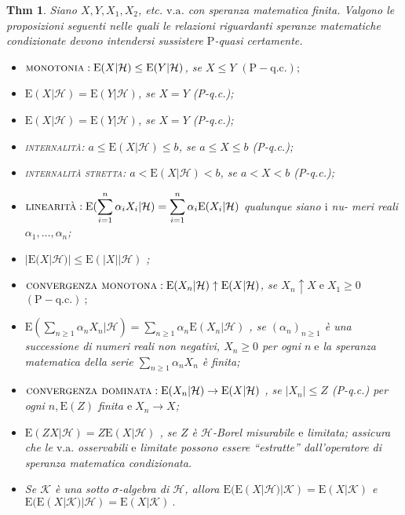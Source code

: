 \documentclass[a4paper,11pt]{article}
\theoremstyle{plain}
\newtheorem{thm}{Thm}[section]
\theoremstyle{definition}
\theoremstyle{remark}
\begin{document}
\begin{thm} Siano $X, Y, X_{1}, X_{2}$, etc. $\mathrm{v}.\mathrm{a}$. con speranza matematica finita. Valgono le proposizioni seguenti nelle quali le relazioni riguardanti speranze matematiche condizionate devono intendersi sussistere $\mathrm{P}$-quasi certamente.
\begin{itemize}
    \item $\textsc{monotonia}: \mathrm{E}(X|\mathcal{H})\leq \mathrm{E}(Y|\mathcal{H})$, se $X\leq Y$ $(\mathrm{P}-\mathrm{q}.\mathrm{c}.);$
    
    \item $\mathrm{E}(X|\mathcal{H})=\mathrm{E}(Y|\mathcal{H})$, se $X=Y$ (P-q.c.);
    
    \item $\mathrm{E}(X|\mathcal{H})=\mathrm{E}(Y|\mathcal{H})$, se $X=Y$ (P-q.c.);
    
    \item \textsc{internalità}: $a\leq \mathrm{E}(X|\mathcal{H})\leq b$, se $a\leq X\leq b$ (P-q.c.);
    
    \item  \textsc{internalità stretta}: $a<\mathrm{E}(X|\mathcal{H})<b$, se $a<X<b$ (P-q.c.);
    \item $\textsc{linearità}: \displaystyle \mathrm{E}(\sum_{i=1}^{n}\alpha_{i}X_{i}|\mathcal{H})=\sum_{i=1}^{n}\alpha_{i}\mathrm{E}(X_{i}|\mathcal{H})$ qualunque siano $\mathrm{i}$ nu- meri reali $\alpha_{1}, \ldots, \alpha_{n}$;
    
    \item  $|\mathrm{E}(X|\mathcal{H})|\leq \mathrm{E}(|X||\mathcal{H})$ ;
    \item $ \textsc{convergenza monotona}: \mathrm{E}(X_{n}|\mathcal{H})\uparrow \mathrm{E}(X|\mathcal{H})$, se $X_{n}\uparrow X\mathrm{\; e \;}X_{1}\geq0$ $(\mathrm{P}- \mathrm{q}.\mathrm{c}.)\ ;$
    \item  $\displaystyle \mathrm{E}(\sum_{n\geq 1}\alpha_{n}X_{n}|\mathcal{H})=\sum_{n\geq 1}\alpha_{n}\mathrm{E}(X_{n}|\mathcal{H})$ , se $(\alpha_{n})_{n\geq 1}$ è una successione di numeri reali non negativi, $X_{n}\geq 0$ per ogni $n\mathrm{\; e}$ la speranza matematica della serie $\displaystyle \sum_{n\geq 1}\alpha_{n}X_{n}$ è finita;
    \item $ \textsc{convergenza dominata}: \mathrm{E}(X_{n}|\mathcal{H})\rightarrow \mathrm{E}(X|\mathcal{H})$ , se $|X_{n}|\leq Z$ (P-q.c.) per ogni $n, \mathrm{E}(Z)$ finita $\mathrm{e \;}X_{n}\rightarrow X$;
    
    \item $\mathrm{E}(ZX|\mathcal{H})=Z\mathrm{E}(X|\mathcal{H})$ , se $Z$ è $\mathcal{H}$-Borel misurabile $\mathrm{e}$ limitata; assicura che le $\mathrm{v}.\mathrm{a}.$ osservabili $\mathrm{e}$ limitate possono essere ``estratte'' dall'operatore di speranza matematica condizionata.
    
    \item Se $\mathcal{K}$ è una sotto $\sigma$-algebra di $\mathcal{H}$, allora $\mathrm{E}(\mathrm{E}(X|\mathcal{H})|\mathcal{K})=\mathrm{E}(X|\mathcal{K})$ e $\mathrm{E}(\mathrm{E}(X|\mathcal{K})|\mathcal{H})=\mathrm{E}(X|\mathcal{K})\ .$
    \end{itemize}
\end{thm}
\end{document}
